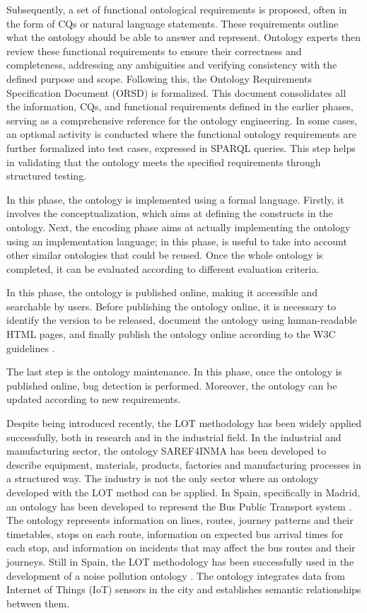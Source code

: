 Subsequently, a set of functional ontological requirements is proposed, often in the form of CQs or natural language statements.
These requirements outline what the ontology should be able to answer and represent. 
Ontology experts then review these functional requirements to ensure their correctness and completeness, addressing any ambiguities and verifying consistency with the defined purpose and scope.
Following this, the Ontology Requirements Specification Document (ORSD) is formalized.
This document consolidates all the information, CQs, and functional requirements defined in the earlier phases, serving as a comprehensive reference for the ontology engineering. 
In some cases, an optional activity is conducted where the functional ontology requirements are further formalized into test cases, expressed in SPARQL queries.
This step helps in validating that the ontology meets the specified requirements through structured testing.

In this phase, the ontology is implemented using a formal language.
Firstly, it involves the conceptualization, which aims at defining the constructs in the ontology.
Next, the encoding phase aims at actually implementing the ontology using an implementation language; in this phase, is useful to take into account other similar ontologies that could be reused.
Once the whole ontology is completed, it can be evaluated according to different evaluation criteria.

In this phase, the ontology is published online, making it accessible and searchable by users. 
Before publishing the ontology online, it is necessary to identify the version to be released, document the ontology using human-readable HTML pages, and finally publish the ontology online according to the W3C guidelines \cite{ontology_online}.

The last step is the ontology maintenance.
In this phase, once the ontology is published online, bug detection is performed.
Moreover, the ontology can be updated according to new requirements.

Despite being introduced recently, the LOT methodology has been widely applied successfully, both in research and in the industrial field.
In the industrial and manufacturing sector, the ontology SAREF4INMA \cite{de2020saref4inma} has been developed to describe equipment, materials, products, factories and manufacturing processes in a structured way. 
The industry is not the only sector where an ontology developed with the LOT method can be applied.
In Spain, specifically in Madrid, an ontology has been developed to represent the Bus Public Transport system \cite{ruckhaus2023applying}. 
The ontology represents information on lines, routes, journey patterns and their timetables, stops on each route, information on expected bus arrival times for each stop, and information on incidents that may affect the bus routes and their journeys.
Still in Spain, the LOT methodology has been successfully used in the development of a noise pollution ontology \cite{espinoza2020using}.
The ontology integrates data from Internet of Things (IoT) sensors in the city and establishes semantic relationships between them.

